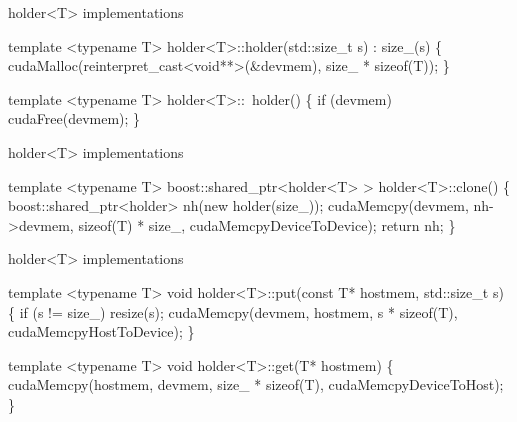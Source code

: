 \begin{frame}[fragile]{holder<T> implementations}
\begin{semiverbatim}template <typename T>
holder<T>::holder(std::size_t s) : size_(s)
\{
   cudaMalloc(reinterpret_cast<void**>(&devmem), 
              size_ * sizeof(T));
\}

template <typename T>
holder<T>::~holder()
\{
  if (devmem)
    cudaFree(devmem);
\}
  \end{semiverbatim}
\end{frame}

\begin{frame}[fragile]{holder<T> implementations}
\begin{semiverbatim}template <typename T>
boost::shared_ptr<holder<T> >
holder<T>::clone()
\{
   boost::shared_ptr<holder> nh(new holder(size_));
   cudaMemcpy(devmem, nh->devmem,
              sizeof(T) * size_,
              cudaMemcpyDeviceToDevice);       
   return nh;
\}
  \end{semiverbatim}
\end{frame}


\begin{frame}[fragile]{holder<T> implementations}
\begin{semiverbatim}template <typename T>
void
holder<T>::put(const T* hostmem, std::size_t s)
\{
  if (s != size_)
    resize(s);
  cudaMemcpy(devmem, hostmem, s * sizeof(T),
             cudaMemcpyHostToDevice);
\}

template <typename T>
void
holder<T>::get(T* hostmem)
\{
  cudaMemcpy(hostmem, devmem, size_ * sizeof(T),
             cudaMemcpyDeviceToHost);
\}\end{semiverbatim}


\end{frame}


